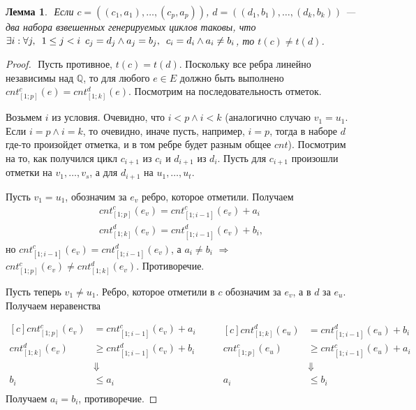 \documentclass{article}
\newcommand{\squad}{
    \hspace{0.5em}
}
\newtheorem{lemma}{Лемма}
\begin{document}
\begin{lemma} $ $
    \label{lemma:eq}
        Если $c = ((c_{1}, a_{1}), \ldots, (c_{p}, a_{p}))$, $d = ((d_{1}, b_{1}), \ldots, (d_{k}, b_{k}))$ --- два набора взвешенных генерируемых циклов таковы, что $\exists i: \forall j, \squad 1 \leq j < i \squad c_{j} = d_{j} \land a_{j} = b_{j}, \squad c_{i} = d_{i} \land a_{i} \neq b_{i}$, то $t(c) \neq t(d)$.
\end{lemma}
\begin{proof} $ $
    Пусть противное, $t(c) = t(d)$. 
    Поскольку все ребра линейно независимы над $\mathbb{Q}$, то для любого $e \in E$ должно быть выполнено $cnt_{[1;p]}^{c}(e) = cnt_{[1;k]}^{d}(e)$. Посмотрим на последовательность отметок.

    Возьмем $i$ из условия. Очевидно, что $i < p \land i < k$ (аналогично случаю $v_{1} = u_{1}$. Если $i = p \land i = k$, то очевидно, иначе пусть, например, $i = p$, тогда в наборе $d$ где-то произойдет отметка, и в том ребре будет разным общее $cnt$). Посмотрим на то, как получился цикл $c_{i + 1}$ из $c_{i}$ и $d_{i + 1}$
    из $d_{i}$. Пусть для $c_{i + 1}$ произошли отметки на $v_{1}, \ldots, v_{s}$, а для $d_{i + 1}$ на $u_{1}, \ldots, u_{t}$. 

    Пусть $v_{1} = u_{1}$, обозначим за $e_{v}$ ребро, которое отметили. Получаем
    \begin{gather*}
        cnt_{[1;p]}^{c}(e_{v}) = cnt_{[1;i - 1]}^{c}(e_{v}) + a_{i} \\
        cnt_{[1;k]}^{d}(e_{v}) = cnt_{[1;i - 1]}^{d}(e_{v}) + b_{i},
    \end{gather*}
    но $cnt_{[1;i - 1]}^{c}(e_{v}) = cnt_{[1;i - 1]}^{d}(e_{v})$, а $a_{i} \neq b_{i}$ $\Rightarrow$ $cnt_{[1;p]}^{c}(e_{v}) \neq cnt_{[1;k]}^{d}(e_{v})$. Противоречие.

    Пусть теперь $v_{1} \neq u_{1}$. Ребро, которое отметили в $c$ обозначим за $e_{v}$, а в $d$ за $e_{u}$. Получаем неравенства

    \begin{equation*}
        \begin{aligned}[c]
        cnt_{[1;p]}^{c}(e_{v}) &= cnt_{[1;i - 1]}^{c}(e_{v}) + a_{i} \\
        cnt_{[1;k]}^{d}(e_{v}) &\geq cnt_{[1;i - 1]}^{d}(e_{v}) + b_{i} \\
        &\Downarrow \\
        b_{i} &\leq a_{i} \\
        \end{aligned}
        \qquad
        \begin{aligned}[c]
        cnt_{[1;k]}^{d}(e_{u}) &= cnt_{[1;i - 1]}^{d}(e_{u}) + b_{i} \\
        cnt_{[1;p]}^{c}(e_{u}) &\geq cnt_{[1;i - 1]}^{c}(e_{u}) + a_{i} \\
        &\Downarrow \\
        a_{i} &\leq b_{i} \\
        \end{aligned} 
    \end{equation*}
    Получаем $a_{i} = b_{i}$, противоречие.
\end{proof}
\end{document}
